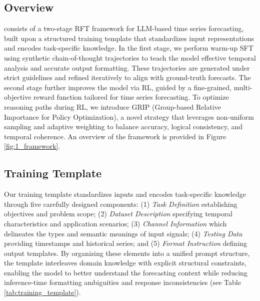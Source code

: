 \subsection{\Ours Overview}

\Ours consists of a two-stage RFT framework for LLM-based time series forecasting, built upon a structured training template that standardizes input representations and encodes task-specific knowledge. In the first stage, we perform warm-up SFT using synthetic chain-of-thought trajectories to teach the model effective temporal analysis and accurate output formatting. These trajectories are generated under strict guidelines and refined iteratively to align with ground-truth forecasts. The second stage further improves the model via RL, guided by a fine-grained, multi-objective reward function tailored for time series forecasting. To optimize reasoning paths during RL, we introduce GRIP (Group-based Relative Importance for Policy Optimization), a novel strategy that leverages non-uniform sampling and adaptive weighting to balance accuracy, logical consistency, and temporal coherence. An overview of the framework is provided in Figure \ref{fig:1_framework}.




\vspace{-0.12in}
\subsection{Training Template}


Our training template standardizes inputs and encodes task-specific knowledge through five carefully designed components: (1) \textit{Task Definition} establishing objectives and problem scope; (2) \textit{Dataset Description} specifying temporal characteristics and application scenarios; (3) \textit{Channel Information} which delineates the types and semantic meanings of input signals; (4) \textit{Testing Data} providing timestamps and historical series; and (5) \textit{Format Instruction} defining output templates. 
By organizing these elements into a unified prompt structure, the template interleaves domain knowledge with explicit structural constraints, enabling the model to better understand the forecasting context while reducing inference-time formatting ambiguities and response inconsistencies (see Table \ref{tab:training_template}).




